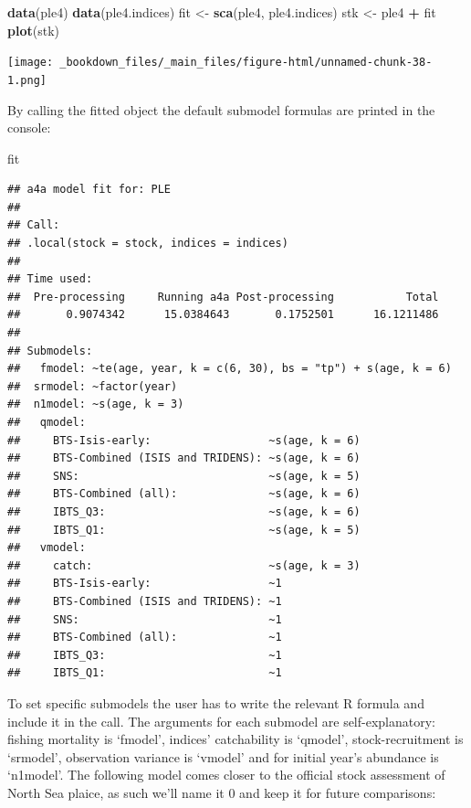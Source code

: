 \documentclass[
]{book}
\newenvironment{Shaded}{\begin{snugshade}}{\end{snugshade}}
\newcommand{\FunctionTok}[1]{\textcolor[rgb]{0.13,0.29,0.53}{\textbf{#1}}}
\newcommand{\NormalTok}[1]{#1}
\newcommand{\OtherTok}[1]{\textcolor[rgb]{0.56,0.35,0.01}{#1}}
\newcommand{\SpecialCharTok}[1]{\textcolor[rgb]{0.81,0.36,0.00}{\textbf{#1}}}
\begin{document}
\begin{Shaded}
\begin{Highlighting}[]
\FunctionTok{data}\NormalTok{(ple4)}
\FunctionTok{data}\NormalTok{(ple4.indices)}
\NormalTok{fit }\OtherTok{\textless{}{-}} \FunctionTok{sca}\NormalTok{(ple4, ple4.indices)}
\NormalTok{stk }\OtherTok{\textless{}{-}}\NormalTok{ ple4 }\SpecialCharTok{+}\NormalTok{ fit}
\FunctionTok{plot}\NormalTok{(stk)}
\end{Highlighting}
\end{Shaded}

\texttt{[image: \_bookdown\_files/\_main\_files/figure-html/unnamed-chunk-38-1.png]}

By calling the fitted object the default submodel formulas are printed in the console:

\begin{Shaded}
\begin{Highlighting}[]
\NormalTok{fit}
\end{Highlighting}
\end{Shaded}

\begin{verbatim}
## a4a model fit for: PLE 
## 
## Call:
## .local(stock = stock, indices = indices)
## 
## Time used:
##  Pre-processing     Running a4a Post-processing           Total 
##       0.9074342      15.0384643       0.1752501      16.1211486 
## 
## Submodels:
##   fmodel: ~te(age, year, k = c(6, 30), bs = "tp") + s(age, k = 6)
##  srmodel: ~factor(year)
##  n1model: ~s(age, k = 3)
##   qmodel:
##     BTS-Isis-early:                  ~s(age, k = 6)
##     BTS-Combined (ISIS and TRIDENS): ~s(age, k = 6)
##     SNS:                             ~s(age, k = 5)
##     BTS-Combined (all):              ~s(age, k = 6)
##     IBTS_Q3:                         ~s(age, k = 6)
##     IBTS_Q1:                         ~s(age, k = 5)
##   vmodel:
##     catch:                           ~s(age, k = 3)
##     BTS-Isis-early:                  ~1
##     BTS-Combined (ISIS and TRIDENS): ~1
##     SNS:                             ~1
##     BTS-Combined (all):              ~1
##     IBTS_Q3:                         ~1
##     IBTS_Q1:                         ~1
\end{verbatim}

To set specific submodels the user has to write the relevant R formula and include it in the call. The arguments for each submodel are self-explanatory: fishing mortality is `fmodel', indices' catchability is `qmodel', stock-recruitment is `srmodel', observation variance is `vmodel' and for initial year's abundance is `n1model'. The following model comes closer to the official stock assessment of North Sea plaice, as such we'll name it \(0\) and keep it for future comparisons:
\end{document}
